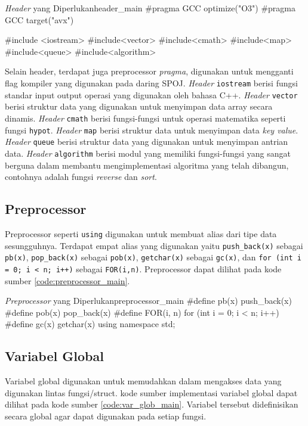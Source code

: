 \newpage
\begin{code}[firstnumber=1]{\textit{Header} yang Diperlukan}{header_main}
#pragma GCC optimize("O3")
#pragma GCC target("avx")

#include <iostream>
#include<vector>
#include<cmath>
#include<map>
#include<queue>
#include<algorithm>
\end{code}

Selain header, terdapat juga preprocessor \textit{pragma}, digunakan untuk mengganti flag kompiler yang digunakan pada daring SPOJ.
\textit{Header} \texttt{iostream} berisi fungsi standar input output operasi yang digunakan oleh bahasa C++. \textit{Header} \texttt{vector} berisi struktur data yang digunakan untuk menyimpan data array secara dinamis. \textit{Header} \texttt{cmath} berisi fungsi-fungsi untuk operasi matematika seperti fungsi \texttt{hypot}. \textit{Header} \texttt{map} berisi struktur data untuk menyimpan data \textit{key value}. \textit{Header} \texttt{queue} berisi struktur data yang digunakan untuk menyimpan antrian data. \textit{Header} \texttt{algorithm} berisi modul yang memiliki fungsi-fungsi yang sangat berguna dalam membantu mengimplementasi algoritma yang telah dibangun, contohnya adalah fungsi \textit{reverse} dan \textit{sort}.

\subsection{ Preprocessor}
Preprocessor seperti \texttt{using} digunakan untuk membuat alias dari tipe data sesungguhnya. Terdapat empat alias yang digunakan yaitu \texttt{push\_back(x)} sebagai \texttt{pb(x)}, \texttt{pop\_back(x)} sebagai \texttt{pob(x)}, \texttt{getchar(x)} sebagai \texttt{gc(x)}, dan \texttt{for (int i = 0; i < n; i++)} sebagai \texttt{FOR(i,n)}. Preprocessor dapat dilihat pada kode sumber \ref{code:preprocessor_main}.

\newpage
\begin{code}[firstnumber=1]{\textit{Preprocessor} yang Diperlukan}{preprocessor_main}
#define pb(x) push_back(x)
#define pob(x) pop_back(x)
#define FOR(i, n) for (int i = 0; i < n; i++)
#define gc(x) getchar(x)
using namespace std;
\end{code}

\subsection{ Variabel Global}
Variabel global digunakan untuk memudahkan dalam mengakses data yang digunakan lintas fungsi/struct. kode sumber implementasi variabel global dapat dilihat pada kode sumber \ref{code:var_glob_main}. Variabel tersebut didefinisikan secara global agar dapat digunakan pada setiap fungsi.

